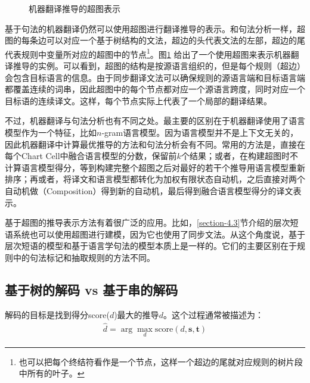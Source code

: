 \begin{figure}[htp]
\centering

\caption{机器翻译推导的超图表示}
\label{fig:4-66}
\end{figure}

\parinterval 基于句法的机器翻译仍然可以使用超图进行翻译推导的表示。和句法分析一样，超图的每条边可以对应一个基于树结构的文法，超边的头代表文法的左部，超边的尾代表规则中变量所对应的超图中的节点\footnote[10]{ 也可以把每个终结符看作是一个节点，这样一个超边的尾就对应规则的树片段中所有的叶子。}。图\ref{fig:4-66} 给出了一个使用超图来表示机器翻译推导的实例。可以看到，超图的结构是按源语言组织的，但是每个规则（超边）会包含目标语言的信息。由于同步翻译文法可以确保规则的源语言端和目标语言端都覆盖连续的词串，因此超图中的每个节点都对应一个源语言跨度，同时对应一个目标语的连续译文。这样，每个节点实际上代表了一个局部的翻译结果。

\parinterval 不过，机器翻译与句法分析也有不同之处。最主要的区别在于机器翻译使用了语言模型作为一个特征，比如$n$-gram语言模型。因为语言模型并不是上下文无关的，因此机器翻译中计算最优推导的方法和句法分析会有不同。常用的方法是，直接在每个Chart Cell中融合语言模型的分数，保留前$k$个结果；或者，在构建超图时不计算语言模型得分，等到构建完整个超图之后对最好的若干个推导用语言模型重新排序；再或者，将译文和语言模型都转化为加权有限状态自动机，之后直接对两个自动机做{\small{}}（Composition）得到新的自动机，最后得到融合语言模型得分的译文表示。

\parinterval 基于超图的推导表示方法有着很广泛的应用。比如，\ref{section-4.3}节介绍的层次短语系统也可以使用超图进行建模，因为它也使用了同步文法。从这个角度说，基于层次短语的模型和基于语言学句法的模型本质上是一样的。它们的主要区别在于规则中的句法标记和抽取规则的方法不同。


\subsection{基于树的解码 vs 基于串的解码}

\parinterval 解码的目标是找到得分score($d$)最大的推导$d$。这个过程通常被描述为：
\begin{eqnarray}
\hat{d} = \arg\max_d \textrm{score} (d,\mathbf{s},\mathbf{t})
\label{eq:4-34}
\end{eqnarray}

